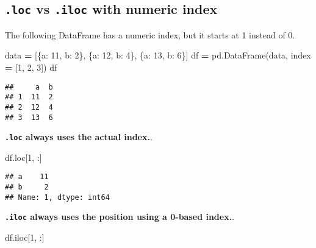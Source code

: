 \documentclass[
]{book}
\newenvironment{Shaded}{\begin{snugshade}}{\end{snugshade}}
\newcommand{\DecValTok}[1]{\textcolor[rgb]{0.00,0.00,0.81}{#1}}
\newcommand{\NormalTok}[1]{#1}
\newcommand{\OperatorTok}[1]{\textcolor[rgb]{0.81,0.36,0.00}{\textbf{#1}}}
\newcommand{\StringTok}[1]{\textcolor[rgb]{0.31,0.60,0.02}{#1}}
\begin{document}
\hypertarget{loc-vs-.iloc-with-numeric-index}{%
\subsection{\texorpdfstring{\texttt{.loc} vs \texttt{.iloc} with numeric index}{.loc vs .iloc with numeric index}}\label{loc-vs-.iloc-with-numeric-index}}

The following DataFrame has a numeric index, but it starts at 1 instead of 0.

\begin{Shaded}
\begin{Highlighting}[]
\NormalTok{data }\OperatorTok{=}\NormalTok{ [\{}\StringTok{\textquotesingle{}a\textquotesingle{}}\NormalTok{: }\DecValTok{11}\NormalTok{, }\StringTok{\textquotesingle{}b\textquotesingle{}}\NormalTok{: }\DecValTok{2}\NormalTok{\},}
\NormalTok{        \{}\StringTok{\textquotesingle{}a\textquotesingle{}}\NormalTok{: }\DecValTok{12}\NormalTok{, }\StringTok{\textquotesingle{}b\textquotesingle{}}\NormalTok{: }\DecValTok{4}\NormalTok{\},}
\NormalTok{        \{}\StringTok{\textquotesingle{}a\textquotesingle{}}\NormalTok{: }\DecValTok{13}\NormalTok{, }\StringTok{\textquotesingle{}b\textquotesingle{}}\NormalTok{: }\DecValTok{6}\NormalTok{\}]}
\NormalTok{df }\OperatorTok{=}\NormalTok{ pd.DataFrame(data, index }\OperatorTok{=}\NormalTok{ [}\DecValTok{1}\NormalTok{, }\DecValTok{2}\NormalTok{, }\DecValTok{3}\NormalTok{])}
\NormalTok{df}
\end{Highlighting}
\end{Shaded}

\begin{verbatim}
##     a  b
## 1  11  2
## 2  12  4
## 3  13  6
\end{verbatim}

{\textbf{\texttt{.loc} always uses the actual index.}}.

\begin{Shaded}
\begin{Highlighting}[]
\NormalTok{df.loc[}\DecValTok{1}\NormalTok{, :] }
\end{Highlighting}
\end{Shaded}

\begin{verbatim}
## a    11
## b     2
## Name: 1, dtype: int64
\end{verbatim}

{\textbf{\texttt{.iloc} always uses the position using a 0-based index.}}.

\begin{Shaded}
\begin{Highlighting}[]
\NormalTok{df.iloc[}\DecValTok{1}\NormalTok{, :]}
\end{Highlighting}
\end{Shaded}
\end{document}

